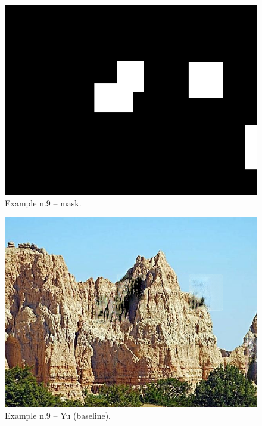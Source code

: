 \documentclass[a4paper, 11pt]{article}
\begin{document}
\begin{figure}
    \centering
    \includegraphics[width=.95\linewidth]{documentation/img/masks/0090_mask.png}
    \caption{Example n.9 -- mask.}
    \label{img:ex_n.9_mask}
\end{figure}
\begin{figure}
    \centering
    \includegraphics[width=.95\linewidth]{documentation/img/baseline/0090.png}
    \caption{Example n.9 -- Yu (baseline).}
    \label{img:ex_n.9_mask}
\end{figure}
\end{document}
